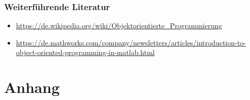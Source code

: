 \documentclass[12pt,bibstyle=none,pagenumberinfooter]{ifmdocument}
\begin{document}
	\subsubsection{Weiterführende Literatur}
\begin{itemize}
\item \url{https://de.wikipedia.org/wiki/Objektorientierte_Programmierung}
		\item \url{https://de.mathworks.com/company/newsletters/articles/introduction-to-object-oriented-programming-in-matlab.html}
\end{itemize}


\section{Anhang}
\end{document}
